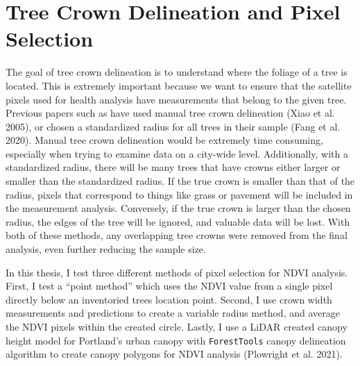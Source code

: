 \documentclass[12pt,twoside]{reedthesis}
\begin{document}
\hypertarget{tree-crown-delineation-and-pixel-selection}{%
\section{Tree Crown Delineation and Pixel Selection}\label{tree-crown-delineation-and-pixel-selection}}

The goal of tree crown delineation is to understand where the foliage of
a tree is located. This is extremely important because we want to ensure
that the satellite pixels used for health analysis have measurements
that belong to the given tree. Previous papers such as have used manual
tree crown delineation (Xiao et al. 2005), or chosen a standardized radius for
all trees in their sample (Fang et al. 2020). Manual tree crown delineation
would be extremely time consuming, especially when trying to examine
data on a city-wide level. Additionally, with a standardized radius,
there will be many trees that have crowns either larger or smaller than
the standardized radius. If the true crown is smaller than that of the
radius, pixels that correspond to things like grass or pavement will be
included in the measurement analysis. Conversely, if the true crown is
larger than the chosen radius, the edges of the tree will be ignored,
and valuable data will be lost. With both of these methods, any
overlapping tree crowns were removed from the final analysis, even
further reducing the sample size.

In this thesis, I test three different methods of pixel selection for
NDVI analysis. First, I test a ``point method'' which uses the NDVI value
from a single pixel directly below an inventoried trees location point.
Second, I use crown width measurements and predictions to create a
variable radius method, and average the NDVI pixels within the created
circle. Lastly, I use a LiDAR created canopy height model for Portland's
urban canopy with \texttt{ForestTools} canopy delineation algorithm to create
canopy polygons for NDVI analysis (Plowright et al. 2021).
\end{document}
